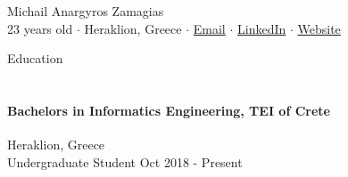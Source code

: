 \documentclass[a4paper, 11pt]{article}
\newcommand{\lineunder} {
    \vspace*{-8pt} \\
    \hspace*{-18pt} \hrulefill \\
}
\newcommand{\header} [1] {
    \vspace*{6mm}
    {\hspace*{-18pt}\vspace*{6pt} #1}
    \vspace*{-6pt} \lineunder
}
\newcommand{\education}[4]{ %
    \paragraph{#1} \hfill #3 \\ %
    #2 \hfill #4 \\ %
}
\newcommand{\socialmediabutton}[2]{%
    \href{#1}{#2}
}
\begin{document}
\vspace*{-30pt}

\begin{center}
    {\Huge {Michail Anargyros Zamagias}} \\\vspace*{2mm}
    23 years old $\cdot$
    Heraklion, Greece $\cdot$
    \socialmediabutton{mailto:contact@mikezamayias.com}{Email}$\cdot$
    \socialmediabutton{https://linkedin.com/in/mikezamayias}{LinkedIn}$\cdot$
    \socialmediabutton{https://mikezamayias.com}{Website}
\end{center}

\header{Education}
\education
{Bachelors in Informatics Engineering, TEI of Crete}
{Undergraduate Student}
{Heraklion, Greece}
{Oct 2018 - Present}
\end{document}
